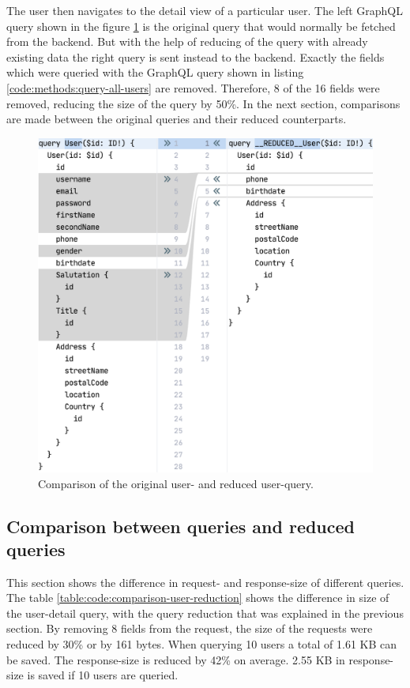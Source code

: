 \documentclass[MSE,Master,english]{twbook}%
\begin{document}
The user then navigates to the detail view of a particular user. The left GraphQL query shown in the figure \ref{figure:code:comparison-user-reduced-user} is the original query that would normally be fetched from the backend. But with the help of reducing of the query with already existing data the right query is sent instead to the backend. Exactly the fields which were queried with the GraphQL query shown in listing \ref{code:methods:query-all-users} are removed. Therefore, 8 of the 16 fields were removed, reducing the size of the query by 50\%. In the next section, comparisons are made between the original queries and their reduced counterparts.

\ifshowImages
\begin{figure}[H]
\centering
\includegraphics[width=0.6\linewidth]{images/reduction-graphql-examples/compare-user-reduced-user.png}
\caption{Comparison of the original user- and reduced user-query.}\label{figure:code:comparison-user-reduced-user}
\end{figure}
\fi

\subsection{Comparison between queries and reduced queries}

This section shows the difference in request- and response-size of different queries. The table \ref{table:code:comparison-user-reduction} shows the difference in size of the user-detail query, with the query reduction that was explained in the previous section. By removing 8 fields from the request, the size of the requests were reduced by 30\% or by 161 bytes. When querying 10 users a total of 1.61 KB can be saved. The response-size is reduced by 42\% on average. 2.55 KB in response-size is saved if 10 users are queried.
\end{document}
